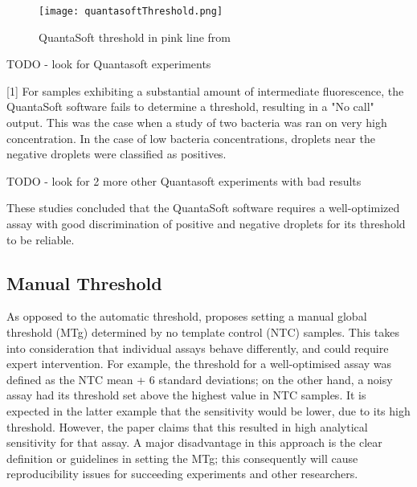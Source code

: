 \begin{figure}[h]
    \centering
    \texttt{[image: quantasoftThreshold.png]}
    \caption[QuantaSoft threshold from a study]{QuantaSoft threshold in pink line from \cite{hussainThreshold}}
        \label{fig:demoQuantThreshold}
\end{figure}


TODO - look for Quantasoft experiments


[1]
For samples exhibiting a substantial amount of intermediate fluorescence, the QuantaSoft software fails to determine a threshold, resulting in a "No call" output. This was the case when a study of two bacteria \cite{Dreo2014} was ran on very high concentration. In the case of low bacteria concentrations, droplets near the negative droplets were classified as positives. 

TODO - look for 2 more other Quantasoft experiments with bad results


These studies concluded that the QuantaSoft software requires a well-optimized assay with good discrimination of positive and negative droplets for its threshold to be reliable.

\subsection{Manual Threshold}
\label{sec:manthreshold}
As opposed to the automatic threshold,  proposes setting a manual global threshold (MTg) determined by no template control (NTC) samples. This takes into consideration that individual assays behave differently, and could require expert intervention. For example, the threshold for a well-optimised assay was defined as the NTC mean + 6 standard deviations; on the other hand, a noisy assay had its threshold set above the highest value in NTC samples. It is expected in the latter example that the sensitivity would be lower, due to its high threshold. However, the paper claims that this resulted in high analytical sensitivity for that assay. A major disadvantage in this approach is the clear definition or guidelines in setting the MTg; this consequently will cause reproducibility issues for succeeding experiments and other researchers.

